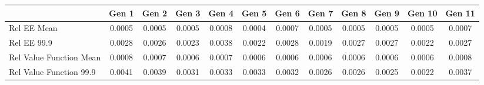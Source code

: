 
\begin{tabular}{@{}lccccccccccc@{}}
\hline
\hline
& Gen 1 & Gen 2 & Gen 3 & Gen 4 & Gen 5 & Gen 6 & Gen 7 & Gen 8 & Gen 9 & Gen 10 & Gen 11 \\
\hline
Rel EE Mean          & 0.0005 & 0.0005 & 0.0005 & 0.0008 & 0.0004 & 0.0007 & 0.0005 & 0.0005 & 0.0005 & 0.0005 & 0.0007 \\
Rel EE 99.9     & 0.0028 & 0.0026 & 0.0023 & 0.0038 & 0.0022 & 0.0028 & 0.0019 & 0.0027 & 0.0027 & 0.0022 & 0.0027 \\
Rel Value Function Mean       & 0.0008 & 0.0007 & 0.0006 & 0.0007 & 0.0006 & 0.0006 & 0.0006 & 0.0006 & 0.0006 & 0.0006 & 0.0008 \\
Rel Value Function 99.9  & 0.0041 & 0.0039 & 0.0031 & 0.0033 & 0.0033 & 0.0032 & 0.0026 & 0.0026 & 0.0025 & 0.0022 & 0.0037 \\
\bottomrule
\end{tabular}